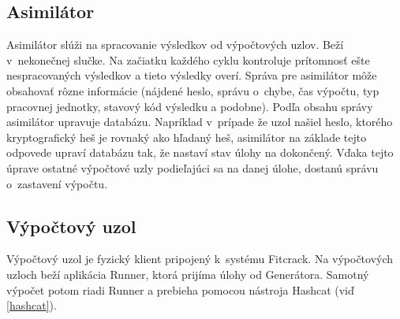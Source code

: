 \documentclass[slovak]{fitthesis}
\begin{document}
\subsection{Asimilátor}
\label{asimilator}
Asimilátor slúži na spracovanie výsledkov od výpočtových uzlov. Beží v~nekonečnej slučke. Na začiatku každého cyklu kontroluje prítomnosť ešte nespracovaných výsledkov a tieto výsledky overí. Správa pre asimilátor môže obsahovať rôzne informácie (nájdené heslo, správu o~chybe, čas výpočtu, typ pracovnej jednotky, stavový kód výsledku a podobne). Podľa obsahu správy asimilátor upravuje databázu. Napríklad v~prípade že uzol našiel heslo, ktorého kryptografický heš je rovnaký ako hľadaný heš, asimilátor na základe tejto odpovede upraví databázu tak, že nastaví stav úlohy na dokončený. Vďaka tejto úprave ostatné výpočtové uzly podieľajúci sa na danej úlohe, dostanú správu o~zastavení výpočtu.

\subsection{Výpočtový uzol}
Výpočtový uzol je fyzický klient pripojený k~systému Fitcrack. Na výpočtových uzloch beží aplikácia Runner, ktorá prijíma úlohy od Generátora. Samotný výpočet potom riadi Runner a prebieha pomocou nástroja Hashcat (viď \ref{hashcat}).
\end{document}
